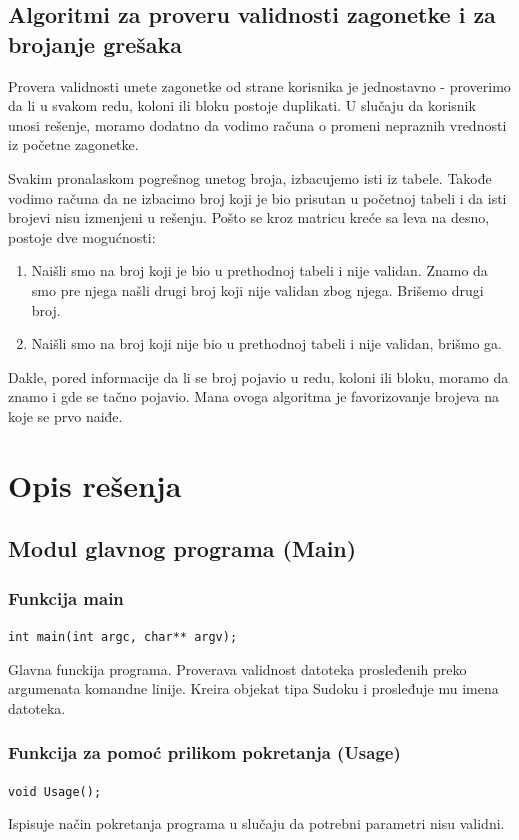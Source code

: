 \documentclass[a4paper]{article}
\begin{document}
    \subsection{Algoritmi za proveru validnosti zagonetke i za brojanje grešaka}
    Provera validnosti unete zagonetke od strane korisnika je jednostavno - proverimo da li u svakom redu, koloni ili bloku postoje duplikati. 
    U slučaju da korisnik unosi rešenje, moramo dodatno da vodimo računa o promeni nepraznih vrednosti iz početne zagonetke.
    \par Svakim pronalaskom pogrešnog unetog broja, izbacujemo isti iz tabele. Tako\-đe vodimo računa da ne izbacimo broj koji je bio prisutan u početnoj tabeli i da isti brojevi nisu izmenjeni u rešenju.
    Pošto se kroz matricu kreće sa leva na desno, postoje dve mogućnosti:
    \begin{enumerate}
        \item Naišli smo na broj koji je bio u prethodnoj tabeli i nije validan. Znamo da smo pre njega našli drugi broj koji nije validan zbog njega. Brišemo drugi broj.
        \item Naišli smo na broj koji nije bio u prethodnoj tabeli i nije validan, brišmo ga.
    \end{enumerate}
    Dakle, pored informacije da li se broj pojavio u redu, koloni ili bloku, moramo da znamo i gde se tačno pojavio. Mana ovoga algoritma je favorizovanje brojeva na koje
    se prvo naiđe.
    \newpage
    \section{Opis rešenja}
    
    \subsection{Modul glavnog programa (Main)}
    \subsubsection{Funkcija main}
    \texttt{int main(int argc, char** argv);}
    \par Glavna funckija programa. Proverava validnost datoteka prosleđenih preko argumenata komandne linije. 
    Kreira objekat tipa Sudoku i prosleđuje mu imena datoteka.
    \subsubsection{Funkcija za pomoć prilikom pokretanja (Usage)}
    \texttt{void Usage();}
    \par Ispisuje način pokretanja programa u slučaju da potrebni parametri nisu validni.
\end{document}
